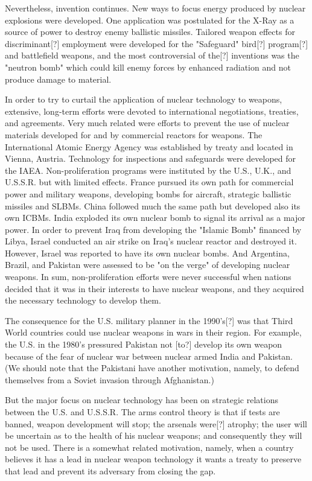 Nevertheless, invention continues. New ways to focus energy produced by nuclear explosions were developed. One application was postulated for the X-Ray as a source of power to destroy enemy ballistic missiles. Tailored weapon effects for discriminant[?] employment were developed for the "Safeguard" bird[?] program[?] and battlefield weapons, and the most controversial of the[?] inventions was the "neutron bomb" which could kill enemy forces by enhanced radiation and not produce damage to material.

In order to try to curtail the application of nuclear technology to weapons, extensive, long-term efforts were devoted to international negotiations, treaties, and agreements. Very much related were efforts to prevent the use of nuclear materials developed for and by commercial reactors for weapons. The International Atomic Energy Agency was established by treaty and located in Vienna, Austria. Technology for inspections and safeguards were developed for the IAEA. Non-proliferation programs were instituted by the U.S., U.K., and U.S.S.R. but with limited effects. France pursued its own path for commercial power and military weapons, developing bombs for aircraft, strategic ballistic missiles and SLBMs. China followed much the same path but developed also its own ICBMs. India exploded its own nuclear bomb to signal its arrival as a major power. In order to prevent Iraq from developing the "Islamic Bomb" financed by Libya, Israel conducted an air strike on Iraq's nuclear reactor and destroyed it. However, Israel was reported to have its own nuclear bombs. And Argentina, Brazil, and Pakistan were assessed to be "on the verge" of developing nuclear weapons. In sum, non-proliferation efforts were never successful when nations decided that it was in their interests to have nuclear weapons, and they acquired the necessary technology to develop them.

The consequence for the U.S. military planner in the 1990's[?] was that Third World countries could use nuclear weapons in wars in their region. For example, the U.S. in the 1980's pressured Pakistan not [to?] develop its own weapon because of the fear of nuclear war between nuclear armed India and Pakistan. (We should note that the Pakistani have another motivation, namely, to defend themselves from a Soviet invasion through Afghanistan.)

But the major focus on nuclear technology has been on strategic relations between the U.S. and U.S.S.R. The arms control theory is that if tests are banned, weapon development will stop; the arsenals were[?] atrophy; the user will be uncertain as to the health of his nuclear weapons; and consequently they will not be used. There is a somewhat related motivation, namely, when a country believes it has a lead in nuclear weapon technology it wants a treaty to preserve that lead and prevent its adversary from closing the gap.

